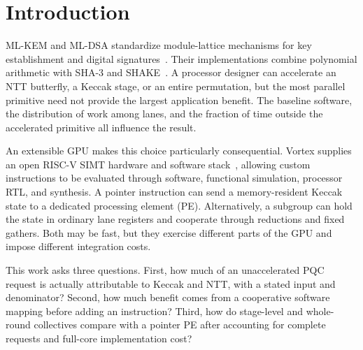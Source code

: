 \documentclass[conference,letterpaper]{IEEEtran}
\begin{document}
\section{Introduction}
ML-KEM and ML-DSA standardize module-lattice mechanisms for key establishment
and digital signatures~\cite{fips203,fips204}. Their implementations combine
polynomial arithmetic with SHA-3 and SHAKE~\cite{fips202}. A processor designer
can accelerate an NTT butterfly, a Keccak stage, or an entire permutation, but
the most parallel primitive need not provide the largest application benefit.
The baseline software, the distribution of work among lanes, and the fraction
of time outside the accelerated primitive all influence the result.

An extensible GPU makes this choice particularly consequential.
Vortex supplies an open RISC-V SIMT hardware and software
stack~\cite{vortex}, allowing custom instructions to be evaluated through
software, functional simulation, processor RTL, and synthesis. A pointer
instruction can send a memory-resident Keccak state to a dedicated processing
element (PE). Alternatively, a subgroup can hold the state in ordinary lane
registers and cooperate through reductions and fixed gathers. Both may be
fast, but they exercise different parts of the GPU and impose different
integration costs.

This work asks three questions. First, how much of an unaccelerated PQC
request is actually attributable to Keccak and NTT, with a stated input and
denominator? Second, how much benefit comes from a cooperative software
mapping before adding an instruction? Third, how do stage-level and
whole-round collectives compare with a pointer PE after accounting for
complete requests and full-core implementation cost?
\end{document}

